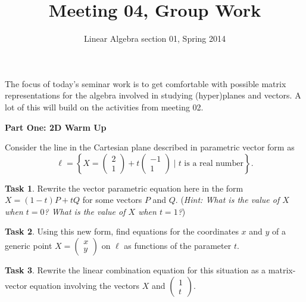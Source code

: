 \documentclass[11pt]{amsart}
\theoremstyle{definition}
\newtheorem{task}{Task}
\begin{document}
\title{Meeting 04, Group Work}
\author{Linear Algebra section 01, Spring 2014}

\maketitle


The focus of today's seminar work is to get comfortable with possible matrix representations for the algebra involved in studying (hyper)planes and vectors. A lot of this will build on the activities from meeting 02.

\vspace{.5cm}

\begin{center}\textbf{Part One: 2D Warm Up}\end{center}


Consider the line in the Cartesian plane described in parametric vector form as
\[
\ell = \left\{ X = \left(\begin{smallmatrix} 2 \\ 1 \end{smallmatrix}\right)
+ t \left( \begin{smallmatrix} -1 \\ 1 \end{smallmatrix} \right) \mid \text{$t$ is a real number}\right\}.
\]
\begin{task}
Rewrite the vector parametric equation here in the form
$X = (1-t) P + t Q$ for some vectors $P$ and $Q$. (\emph{Hint: What is the value of $X$ when $t=0$? What is the value of $X$ when $t=1$?})
\end{task}

\vspace{.75in}

\begin{task}
Using this new form, find equations for the coordinates $x$ and $y$ of a generic point $X = \left( \begin{smallmatrix} x \\ y \end{smallmatrix}\right)$ on $\ell$ as functions of the parameter $t$.
\end{task}

\vspace{.75in}

\begin{task}
Rewrite the linear combination equation for this situation as a matrix-vector equation involving the vectors $X$ and $\left(\begin{smallmatrix}1 \\ t \end{smallmatrix}\right)$.
\end{task}
\end{document}
